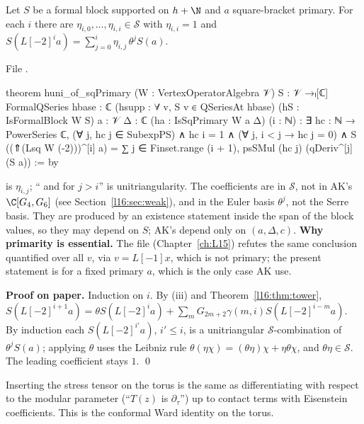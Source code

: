 \begin{theorem}\label{l16:thm:huni}
Let $S$ be a formal block supported on $h+\N$ and $a$ square-bracket primary. For each $i$ there are
$\eta_{i,0},\dots,\eta_{i,i}\in\mathcal S$ with $\eta_{i,i} = 1$ and
$S(L[-2]^ia) = \sum_{j=0}^{i}\eta_{i,j}\,\theta^jS(a)$.
\end{theorem}
\noindent File .
\begin{leancode}
theorem huni_of_sqPrimary (W : VertexOperatorAlgebra 𝒱)
    {S : 𝒱 →ₗ[ℂ] FormalQSeries} {hbase : ℂ} (hsupp : ∀ v, S v ∈ QSeriesAt hbase)
    (hS : IsFormalBlock W S) {a : 𝒱} {Δ : ℂ} (ha : IsSqPrimary W a Δ) (i : ℕ) :
    ∃ hc : ℕ → PowerSeries ℂ, (∀ j, hc j ∈ SubexpPS) ∧ hc i = 1 ∧ (∀ j, i < j → hc j = 0) ∧
      S ((⇑(Lsq W (-2)))^[i] a)
        = ∑ j ∈ Finset.range (i + 1), psSMul (hc j) (qDeriv^[j] (S a)) := by
\end{leancode}

\begin{dictionary}
 is $\eta_{i,j}$; `` and  for $j>i$'' is unitriangularity. The coefficients
are in $\mathcal S$, not in AK's $\C[G_4,G_6]$ (see Section~\ref{l16:sec:weak}), and in the Euler basis $\theta^j$, not
the Serre basis. They are produced by an existence statement inside the span of the block values, so they may depend on
$S$; AK's depend only on $(a,\Delta,c)$. \textbf{Why primarity is essential.} The file 
(Chapter~\ref{ch:L15}) refutes the same conclusion quantified over all $v$, via $v = L[-1]x$, which is not primary; the
present statement is for a fixed primary $a$, which is the only case AK use.
\end{dictionary}

\textbf{Proof on paper.} Induction on $i$. By (iii) and Theorem~\ref{l16:thm:tower},
$S(L[-2]^{i+1}a) = \theta S(L[-2]^ia) + \sum_{m}G_{2m+2}\gamma(m,i)S(L[-2]^{i-m}a)$. By induction each
$S(L[-2]^{i'}a)$, $i'\le i$, is a unitriangular $\mathcal S$-combination of $\theta^jS(a)$; applying $\theta$ uses the
Leibniz rule $\theta(\eta\chi) = (\theta\eta)\chi + \eta\theta\chi$, and $\theta\eta\in\mathcal S$. The leading
coefficient stays $1$. \qed

\begin{physics}
Inserting the stress tensor on the torus is the same as differentiating with respect to the modular parameter
(``$T(z)$ is $\partial_\tau$'') up to contact terms with Eisenstein coefficients. This is the conformal Ward identity on
the torus.
\end{physics}

